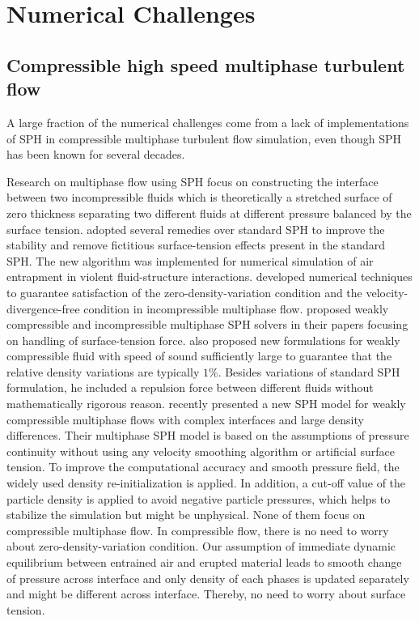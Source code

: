 \section{Numerical Challenges}

\subsection{Compressible high speed multiphase turbulent flow}
\label{sec:Compressible-high-speed-multiphase-turbulent-flow}
A large fraction of the numerical challenges come from a lack of implementations of SPH in compressible multiphase turbulent flow simulation, even though SPH has been known for several decades.

Research on multiphase flow using SPH focus on constructing the interface between two incompressible fluids which is theoretically a stretched surface of zero thickness  separating two different fluids at different pressure balanced by the surface tension.
\citet{colagrossi2003numerical} adopted several remedies over standard SPH to improve the stability and remove fictitious surface-tension effects present in the standard SPH. The new algorithm was implemented for numerical simulation of air entrapment in violent fluid-structure interactions. \citet{hu2007incompressible} developed numerical techniques to guarantee satisfaction of the zero-density-variation condition and the velocity-divergence-free condition in incompressible multiphase flow. \citet{adami2010new} proposed weakly compressible and incompressible multiphase SPH solvers in their papers focusing on handling of surface-tension force. \citet{monaghan2013simple} also proposed new formulations for weakly compressible fluid with speed of sound sufficiently large to guarantee that the relative density variations are typically $1\%$. Besides variations of standard SPH formulation, he included a repulsion force between different fluids without mathematically rigorous reason. \citet {chen2015sph} recently presented a new SPH model for weakly compressible multiphase flows with complex interfaces and large density differences. Their multiphase SPH model is based on the assumptions of pressure continuity without using any velocity smoothing algorithm or artificial surface tension. To improve the computational accuracy and smooth pressure field, the widely used density re-initialization is applied. In addition, a cut-off value of the particle density is applied to avoid negative particle pressures, which helps to stabilize the simulation but might be unphysical. None of them focus on compressible multiphase flow.
In compressible flow, there is no need to worry about zero-density-variation condition. Our assumption of immediate dynamic equilibrium between entrained air and erupted material leads to smooth change of pressure across interface and  only density of each phases is updated separately and might be different across interface. Thereby, no need to worry about surface tension.
 
